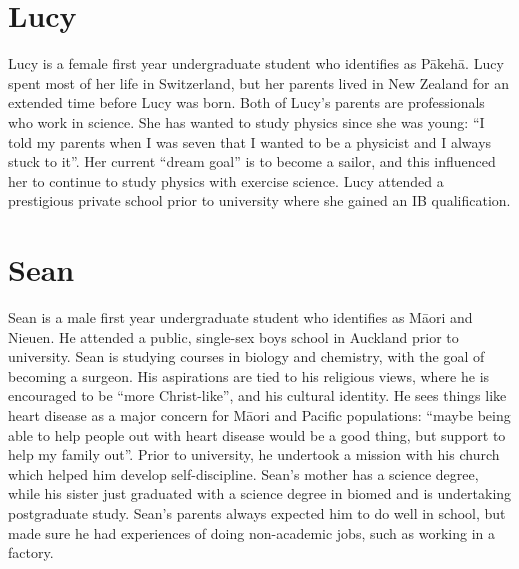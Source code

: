 \section{Lucy}
Lucy is a female first year undergraduate student who identifies as P\={a}keh\={a}. Lucy spent most of her life in Switzerland, but her parents lived in New Zealand for an extended time before Lucy was born. Both of Lucy's parents are professionals who work in science. She has wanted to study physics since she was young: ``I told my parents when I was seven that I wanted to be a physicist and I always stuck to it''. Her current ``dream goal'' is to become a sailor, and this influenced her to continue to study physics with exercise science. Lucy attended a prestigious private school prior to university where she gained an IB qualification. 

\section{Sean}
Sean is a male first year undergraduate student who identifies as M\={a}ori and Nieuen. He attended a public, single-sex boys school in Auckland prior to university. Sean is studying courses in biology and chemistry, with the goal of becoming a surgeon. His aspirations are tied to his religious views, where he is encouraged to be ``more Christ-like'', and his cultural identity. He sees things like heart disease as a major concern for M\={a}ori and Pacific populations: ``maybe being able to help people out with heart disease would be a good thing, but support to help my family out''. Prior to university, he undertook a mission with his church which helped him develop self-discipline. Sean's mother has a science degree, while his sister just graduated with a science degree in biomed and is undertaking postgraduate study. Sean's parents always expected him to do well in school, but made sure he had experiences of doing non-academic jobs, such as working in a factory. 

